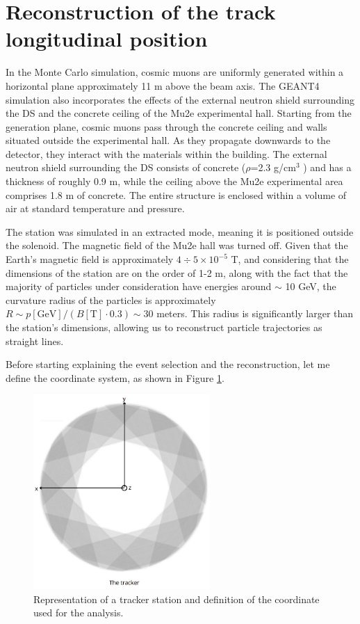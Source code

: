 \section{Reconstruction of the track longitudinal position}
In the Monte Carlo simulation, cosmic muons are uniformly generated within a horizontal plane approximately 11 m 
above the beam axis. The GEANT4 simulation also incorporates the effects of the external neutron shield surrounding the DS 
and the concrete ceiling of the Mu2e experimental hall. Starting from the generation plane, 
cosmic muons pass through the concrete ceiling and walls situated outside the experimental hall. 
As they propagate downwards to the detector, they interact with the materials within the building. 
The external neutron shield surrounding the DS consists of concrete ($\rho$=2.3 g/cm$^3$ ) and has a thickness of 
roughly 0.9 m, while the ceiling above the Mu2e experimental area comprises 1.8 m of concrete. 
The entire structure is enclosed within a volume of air at standard temperature and pressure.

The station was simulated in an extracted mode, meaning it is positioned outside the solenoid. The magnetic field of the Mu2e hall was turned off. 
Given that the Earth's magnetic field is approximately $4 \div 5 \times 10^{-5}$ T, 
and considering that the dimensions of the station are on the order of 1-2 m, 
along with the fact that the majority of particles under consideration have energies around $\sim$ 10 GeV, 
the curvature radius of the particles is approximately $R\sim p[\text{GeV}]/(B[\text{T}]\cdot 0.3) \sim 30$ meters. 
This radius is significantly larger than the station's dimensions, allowing us to reconstruct particle trajectories as straight lines.

Before starting explaining the event selection and the reconstruction, let me define the coordinate system, as shown in Figure \ref{fig:coordinate}.
\begin{figure}[!h]
    \centering
    \includegraphics[width =0.6\textwidth]{figures/png/Screenshot_20240526_164527.png}
    \caption{Representation of a tracker station and definition of the coordinate used for the analysis.}
    \label{fig:coordinate}
\end{figure}
